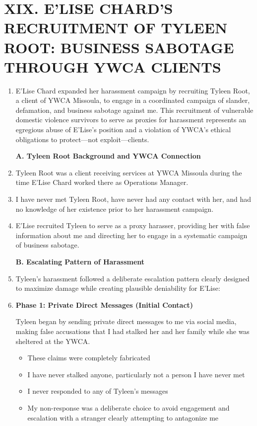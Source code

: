 \documentclass[12pt,letterpaper]{article}
\begin{document}
\section*{XIX. E'LISE CHARD'S RECRUITMENT OF TYLEEN ROOT: BUSINESS SABOTAGE THROUGH YWCA CLIENTS}

\begin{enumerate}

\item E'Lise Chard expanded her harassment campaign by recruiting Tyleen Root, a client of YWCA Missoula, to engage in a coordinated campaign of slander, defamation, and business sabotage against me. This recruitment of vulnerable domestic violence survivors to serve as proxies for harassment represents an egregious abuse of E'Lise's position and a violation of YWCA's ethical obligations to protect---not exploit---clients.

\textbf{A. Tyleen Root Background and YWCA Connection}

\item Tyleen Root was a client receiving services at YWCA Missoula during the time E'Lise Chard worked there as Operations Manager.

\item I have never met Tyleen Root, have never had any contact with her, and had no knowledge of her existence prior to her harassment campaign.

\item E'Lise recruited Tyleen to serve as a proxy harasser, providing her with false information about me and directing her to engage in a systematic campaign of business sabotage.

\textbf{B. Escalating Pattern of Harassment}

\item Tyleen's harassment followed a deliberate escalation pattern clearly designed to maximize damage while creating plausible deniability for E'Lise:

\item \textbf{Phase 1: Private Direct Messages (Initial Contact)}

Tyleen began by sending private direct messages to me via social media, making false accusations that I had stalked her and her family while she was sheltered at the YWCA.

\begin{itemize}
\item These claims were completely fabricated
\item I have never stalked anyone, particularly not a person I have never met
\item I never responded to any of Tyleen's messages
\item My non-response was a deliberate choice to avoid engagement and escalation with a stranger clearly attempting to antagonize me
\end{itemize}


\end{enumerate}
\end{document}
